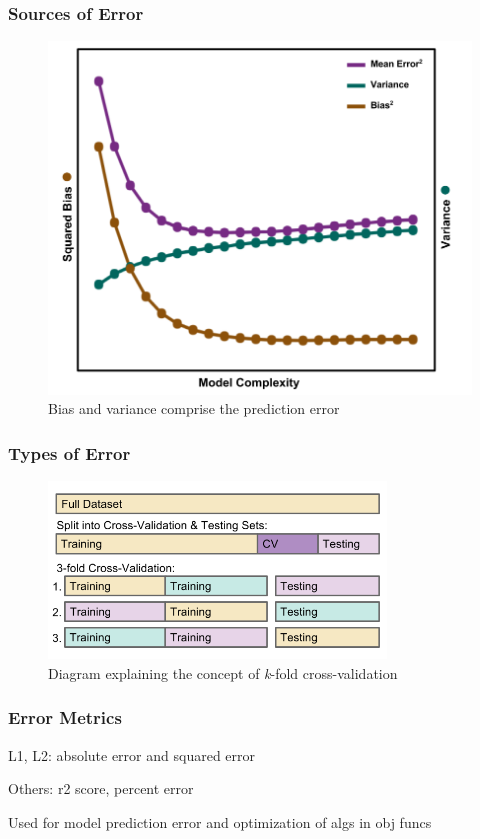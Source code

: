 
\begin{frame}
  \frametitle{Sources of Error}
  \begin{figure}[h!]
    \centering
    \includegraphics[height=0.7\textheight]{./figures/BVtradeoff.png}
    \caption{Bias and variance comprise the prediction error}
  \end{figure}
\end{frame}

\begin{frame}
  \frametitle{Types of Error}
  \begin{figure}[h!]
    \centering
    \includegraphics[width=0.8\textwidth]{./figures/cverror.png}
    \caption{Diagram explaining the concept of \textit{k}-fold cross-validation}
  \end{figure}
\end{frame}

\begin{frame}
  \frametitle{Error Metrics}
  L1, L2: absolute error and squared error
  
  Others: r2 score, percent error 

  Used for model prediction error and optimization of algs in obj funcs
\end{frame}
